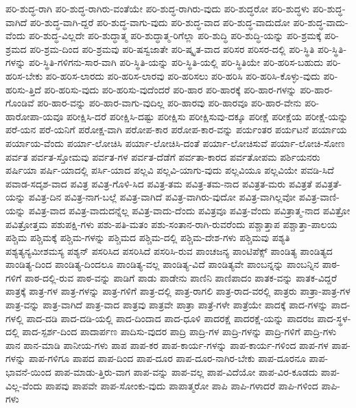 {ಪರಿ-ಶುದ್ಧ-ರಾಗಿ
ಪರಿ-ಶುದ್ಧ-ರಾಗಿರು-ವಂತೆಯೇ
ಪರಿ-ಶುದ್ಧ-ರಾಗಿರು-ವುದು
ಪರಿ-ಶುದ್ಧರೋ
ಪರಿ-ಶುದ್ಧಳು
ಪರಿ-ಶುದ್ಧ-ವಾಗಿದೆ
ಪರಿ-ಶುದ್ಧ-ವಾಗಿ-ದ್ದರೆ
ಪರಿ-ಶುದ್ಧ-ವಾಗು-ವುದು
ಪರಿ-ಶುದ್ಧ-ವಾದ
ಪರಿ-ಶುದ್ಧ-ವಾದುದೋ
ಪರಿ-ಶುದ್ಧ-ವಾದು-ವೆಂದು
ಪರಿ-ಶುದ್ಧ-ವಿಲ್ಲದೇ
ಪರಿ-ಶುದ್ಧಾತ್ಮ
ಪರಿ-ಶುದ್ಧಾತ್ಮ-ರಿಗೆಲ್ಲಾ
ಪರಿ-ಶುದ್ಧಿ
ಪರಿ-ಶುದ್ಧಿ-ಯನ್ನು
ಪರಿ-ಶ್ರಮಕ್ಕೆ
ಪರಿ-ಶ್ರಮದ
ಪರಿ-ಶ್ರಮ-ದಿಂದ
ಪರಿ-ಶ್ರಮವು
ಪರಿ-ಷಸ್ವಜಾತೇ
ಪರಿ-ಷ್ಕೃತ-ವಾದ
ಪರಿಸರ
ಪರಿಸರ-ದಲ್ಲಿ
ಪರಿ-ಸ್ಥಿತಿ
ಪರಿ-ಸ್ಥಿತಿ-ಗಳನ್ನು
ಪರಿ-ಸ್ಥಿತಿ-ಗಳಿಗನು-ಸಾರ-ವಾಗಿ
ಪರಿ-ಸ್ಥಿತಿ-ಯನ್ನು
ಪರಿ-ಸ್ಥಿತಿ-ಯಲ್ಲಿ
ಪರಿ-ಸ್ಥಿತಿಯೇ
ಪರಿ-ಹರಿಸ-ಬಹುದು
ಪರಿ-ಹರಿಸ-ಬೇಕು
ಪರಿ-ಹರಿಸ-ಲಾರದು
ಪರಿ-ಹರಿಸ-ಲಾರವು
ಪರಿ-ಹರಿಸಲು
ಪರಿ-ಹರಿಸಿ
ಪರಿ-ಹರಿಸಿ-ಕೊಳ್ಳು-ವುದು
ಪರಿ-ಹರಿಸು-ತ್ತಿದೆ
ಪರಿ-ಹರಿಸು-ವುದು
ಪರಿ-ಹರಿಸು-ವುದೆಂದರೆ
ಪರಿ-ಹಾರ
ಪರಿ-ಹಾರಕ್ಕೆ
ಪರಿ-ಹಾರ-ಗಳನ್ನು
ಪರಿ-ಹಾರ-ಗೊಂಡಿವೆ
ಪರಿ-ಹಾರ-ವನ್ನು
ಪರಿ-ಹಾರ-ವಾಗು-ವುದಿಲ್ಲ
ಪರಿ-ಹಾರವು
ಪರಿ-ಹಾರವೂ
ಪರಿ-ಹಾರ-ವೇನು
ಪರಿ-ಹಾರೋಪಾ-ಯವೂ
ಪರೀಕ್ಷಿಸಿ-ದರೆ
ಪರೀಕ್ಷಿಸಿ-ದಷ್ಟು
ಪರೀಕ್ಷಿಸು
ಪರೀಕ್ಷಿಸುವು-ದಕ್ಕೂ
ಪರೀಕ್ಷೆ
ಪರೀಕ್ಷೆಯ
ಪರೀಕ್ಷೆ-ಯನ್ನು
ಪರೆ-ಯನ
ಪರೆ-ಯನಿಗೆ
ಪರೋಕ್ಷ-ವಾಗಿ
ಪರೋಪ-ಕಾರ
ಪರೋಪ-ಕಾರ-ವನ್ನು
ಪರ್ಯಂತರ
ಪರ್ಯಟನೆ
ಪರ್ಯಾಯ
ಪರ್ಯಾಯ-ವೆಂದು
ಪರ್ಯಾ-ಲೋಚಿಸಿ
ಪರ್ಯಾ-ಲೋಚಿಸಿ-ದಂತೆ
ಪರ್ಯಾ-ಲೋಚಿಸುವೆ
ಪರ್ಯಾ-ಲೋಚಿ-ಸೋಣ
ಪರ್ವತ
ಪರ್ವತ-ಸ್ತೋಮವು
ಪರ್ವತ-ಗಳ
ಪರ್ವತ-ದೆಡೆಗೆ
ಪರ್ವತಾ-ಕಾರದ
ಪರ್ವತೋಪಮ
ಪರ್ಶಿಯನರು
ಪರ್ಷಿಯಾ
ಪರ್ಷಿ-ಯಾದಲ್ಲಿ
ಪರ್ಸಿ-ಯಾದ
ಪಲ್ಲವಿ
ಪಲ್ಲವಿ-ಯಾಗು-ವುದು
ಪಲ್ಲವಿಯೂ
ಪಲ್ಲವಿಯೇ
ಪವಡಿ-ಸಿದೆ
ಪವಾಡ-ಸದೃಶ-ವಾದ
ಪವಿತ್ರ
ಪವಿತ್ರ-ಗೊಳಿ-ಸಿದ
ಪವಿತ್ರ-ತಮ
ಪವಿತ್ರ-ತಮ-ನಾದ
ಪವಿತ್ರತ-ಮರು
ಪವಿತ್ರತೆ
ಪವಿತ್ರತೆ-ಯನ್ನು
ಪವಿತ್ರ-ದಿನ
ಪವಿತ್ರ-ನಾಗ-ಬಲ್ಲೆ
ಪವಿತ್ರ-ವಾಗಿದೆ
ಪವಿತ್ರ-ವಾಗಿರು-ವುದೋ
ಪವಿತ್ರ-ವಾಗಿಲ್ಲವೋ
ಪವಿತ್ರ-ವಾಣಿ-ಯನ್ನು
ಪವಿತ್ರ-ವಾದ
ಪವಿತ್ರ-ವಾದುದನ್ನೆಲ್ಲ
ಪವಿತ್ರ-ವಾದು-ದೆಂದು
ಪವಿತ್ರವೂ
ಪವಿತ್ರ-ವೆಂದು
ಪವಿತ್ರಾತ್ಮ-ನಾದ
ಪವಿತ್ರೋ
ಪವಿತ್ರೋತ್ತಮ
ಪಶುಪಕ್ಷಿ-ಗಳು
ಪಶು-ಪತಿ-ಮತಂ
ಪಶು-ಸಂತಾನ-ರಾಗಿ-ರುವರೆಂದು
ಪಶ್ಚಾತ್ತಾಪ
ಪಶ್ಚಾತ್ತಾ-ಪಾಲಯ
ಪಶ್ಚಿಮ
ಪಶ್ಚಿಮಕ್ಕೆ
ಪಶ್ಚಿಮ-ಗಳನ್ನು
ಪಶ್ಚಿಮದ
ಪಶ್ಚಿಮ-ದಲ್ಲಿ
ಪಶ್ಚಿಮ-ದೇಶ-ಗಳು
ಪಶ್ಚಿಮವು
ಪಶ್ಯತಿ
ಪಶ್ಯತ್ಯನ್ಯಮೀಶಮಸ್ಯ
ಪಶ್ಯನ್
ಪಸರಿಸಿದ
ಪಸರಿಸಿದೆ
ಪಸರಿಸಿ-ರುವ
ಪಾಂಚಜನ್ಯ
ಪಾಂಟಿಪೆಕ್ಸ್
ಪಾಂಡಿತ್ಯ
ಪಾಂಡಿತ್ಯದ
ಪಾಂಡಿತ್ಯ-ದಿಂದ
ಪಾಂಡಿತ್ಯ-ದಿಂದಲೂ
ಪಾಂಡಿತ್ಯ-ವಲ್ಲ
ಪಾಂಡಿತ್ಯ-ವಿದೆ
ಪಾಂಡಿತ್ಯವೇ
ಪಾಂಬನ್ನನ್ನು
ಪಾಂಬನ್ನಿನ
ಪಾಠ-ಗಳಿಗೆ
ಪಾಠ-ದಲ್ಲಿ-ರುವ
ಪಾಠ-ವನ್ನು
ಪಾಡಿಗೆ
ಪಾಡು
ಪಾಡೇನು
ಪಾಣಿನಿ
ಪಾಣಿಪಾದಂ
ಪಾತಕ-ವನ್ನು
ಪಾತಕ-ವಿದ್ದರೆ
ಪಾತ್ರಕ್ಕೆ
ಪಾತ್ರ-ಗಳ
ಪಾತ್ರ-ಗಳನ್ನು
ಪಾತ್ರ-ಗಳಿಗೆ
ಪಾತ್ರ-ದಲ್ಲಿ
ಪಾತ್ರ-ರಾಗಲಿ
ಪಾತ್ರ-ರಾದ-ವರಲ್ಲಿ
ಪಾತ್ರರು
ಪಾತ್ರಾ-ಪಾತ್ರ-ಗಳ
ಪಾತ್ರ-ವನ್ನು
ಪಾತ್ರ-ವಾಗಿದೆ
ಪಾತ್ರ-ವಾದ
ಪಾತ್ರವು
ಪಾತ್ರವೇ
ಪಾತ್ರಾ
ಪಾತ್ರೆ-ಗಳೇ
ಪಾತ್ರೆಯೇ
ಪಾದಕ್ಕೆ
ಪಾದ-ಗಳನ್ನು
ಪಾದ-ಗಳಲ್ಲಿ
ಪಾದ-ದಡಿ
ಪಾದ-ದಡಿ-ಯಲ್ಲಿ
ಪಾದ-ದಿಂದಾದ
ಪಾದ-ಧೂಳಿ
ಪಾದರಕ್ಷೆ
ಪಾದರಕ್ಷೆ-ಯನ್ನು
ಪಾದರಜ
ಪಾದ-ಸ್ಥಳ-ದಲ್ಲಿ
ಪಾದ-ಸ್ಪರ್ಶ-ದಿಂದ
ಪಾದಾರ್ಪಣ
ಪಾದಿಸು-ವುದರ
ಪಾದ್ರಿ
ಪಾದ್ರಿ-ಗಳ
ಪಾದ್ರಿ-ಗಳನ್ನು
ಪಾದ್ರಿ-ಗಳಿಗೆ
ಪಾದ್ರಿ-ಗಳು
ಪಾನ
ಪಾನ-ಮಾಡಿ
ಪಾನೀಯ-ಗಳು
ಪಾಪ
ಪಾಪ-ಕರ
ಪಾಪ-ಕಾರ್ಯ-ಗಳನ್ನು
ಪಾಪ-ಕಾರ್ಯ-ಗಳಿಂದ
ಪಾಪ-ಗಳ
ಪಾಪ-ಗಳನ್ನು
ಪಾಪ-ಗಳಿಗೂ
ಪಾಪದ
ಪಾಪ-ದಿಂದ
ಪಾಪ-ದೂರ
ಪಾಪ-ದೂರ-ನಾಗಿರ-ಬೇಕು
ಪಾಪ-ದೂರನೂ
ಪಾಪ-ಭಾವನೆ-ಯಿಂದ
ಪಾಪ-ಮಾಡು-ತ್ತಿರು-ವಾಗ
ಪಾಪ-ವನ್ನು
ಪಾಪ-ವಲ್ಲ
ಪಾಪ-ವಿದೆಯೋ
ಪಾಪ-ವಿರ-ಕೂಡದು
ಪಾಪ-ವಿಲ್ಲ-ವೆಂದು
ಪಾಪವು
ಪಾಪವೇ
ಪಾಪ-ಸೋಂಕು-ವುದು
ಪಾಪಾತ್ಮರೋ
ಪಾಪಿ
ಪಾಪಿ-ಗಳಾದರೆ
ಪಾಪಿ-ಗಳಿಂದ
ಪಾಪಿ-ಗಳು
}
